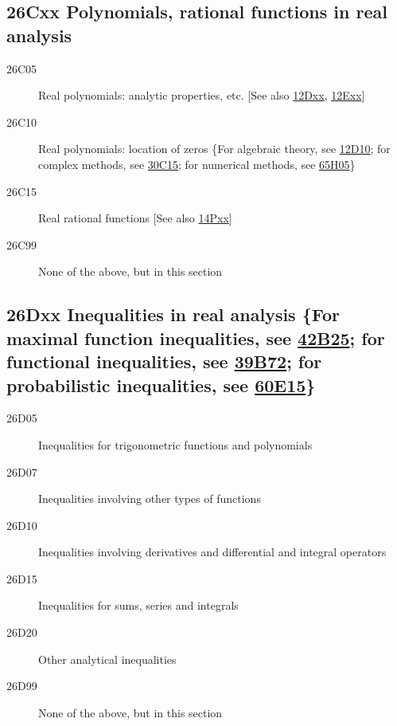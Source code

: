 \documentclass[letterpaper]{article}
\begin{document}
\subsection*{26Cxx  Polynomials, rational functions in real analysis}\label{26Cxx}
\begin{description}
\item [26C05]\label{26C05} Real polynomials: analytic properties, etc. [See also \hyperref[12Dxx]{12Dxx}, \hyperref[12Exx]{12Exx}]
\item [26C10]\label{26C10} Real polynomials: location of zeros \{For algebraic theory, see \hyperref[12D10]{12D10}; for complex methods, see \hyperref[30C15]{30C15}; for numerical methods, see \hyperref[65H05]{65H05}\}
\item [26C15]\label{26C15} Real rational functions [See also \hyperref[14Pxx]{14Pxx}]
\item [26C99]\label{26C99} None of the above, but in this section
\end{description}
\subsection*{26Dxx  Inequalities in real analysis \{For maximal function inequalities, see \hyperref[42B25]{42B25}; for functional inequalities, see \hyperref[39B72]{39B72}; for probabilistic inequalities, see \hyperref[60E15]{60E15}\} }\label{26Dxx}
\begin{description} 
\item [26D05]\label{26D05} Inequalities for trigonometric functions and polynomials
\item [26D07]\label{26D07} Inequalities involving other types of functions
\item [26D10]\label{26D10} Inequalities involving derivatives and differential and integral operators
\item [26D15]\label{26D15} Inequalities for sums, series and integrals
\item [26D20]\label{26D20} Other analytical inequalities
\item [26D99]\label{26D99} None of the above, but in this section
\end{description}
\end{document}
